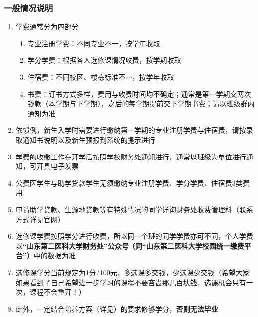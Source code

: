 \subsubsection[一般情况说明]{一般情况说明}
\label{tuition}
\begin{enumerate}
    \item 学费通常分为四部分\footnotemark
          \begin{enumerate}
              \item 专业注册学费：不同专业不一，按学年收取
              \item 学分学费：根据各人选修课情况收费，按学期收取
              \item 住宿费：不同校区、楼栋标准不一，按学年收取
              \item 书费：订书方式多样，费用与收费时间均不确定；通常是第一学期交两次钱款（本学期与下学期），之后的每学期提前交下学期书费；请以班级群内通知为准
          \end{enumerate}
    \item 依惯例，新生入学时需要进行缴纳第一学期的专业注册学费与住宿费，请按录取通知书说明以及新生预报到系统\footnotemark 的提示进行
    \item 学费的收缴工作在开学后按照学校财务处通知进行，通常以班级为单位进行通知，可开具电子发票
    \item 公费医学生与助学贷款学生无须缴纳专业注册学费、学分学费、住宿费3类费用
    \item 申请助学贷款、生源地贷款等有特殊情况的同学详询财务处收费管理科（联系方式详见官网）
    \item 选修课学费按照学分进行收费，所以同一个班的同学学费亦可不同，个人学费以\textbf{“山东第二医科大学财务处”公众号（同“山东第二医科大学校园统一缴费平台”）}中的数据为准
    \item 选修课学分当前规定为1分/100元，多选课多交钱，少选课少交钱（希望大家如果看到了自己希望进一步学习的课程不要吝啬那几百块钱，选课机会只有一次，课程不会重开！）
    \item 此外，一定结合培养方案（详见）的要求修够学分，\textbf{否则无法毕业}
\end{enumerate}

